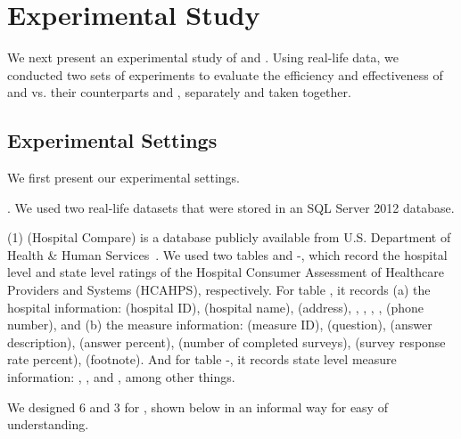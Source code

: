 



\section{Experimental Study}
\label{sec-exp}

We next present an experimental study of \pCFDs and \pCINDs. Using real-life data, we conducted two sets of experiments to evaluate the efficiency and effectiveness of \pCFDs and \pCINDs vs. their counterparts \CFDs and \CINDs, separately and taken together.

\subsection{Experimental Settings}
We first present our experimental settings.

. We used two real-life datasets that were stored in an SQL Server 2012 database.

\ni(1) \hosp (Hospital Compare) is a database publicly available from U.S. Department of Health %
\& Human Services~\cite{hosp}. We used two tables  and -, which record the hospital level and state level ratings of the Hospital Consumer Assessment of Healthcare Providers and Systems (HCAHPS), respectively.
%
For table , it records (a) the hospital information:  (hospital ID),  (hospital name),  (address), , , , ,  (phone number), and (b) the measure information:  (measure ID),  (question),  (answer description),  (answer percent),  (number of completed surveys),  (survey response rate percent),  (footnote).
%
And for table -, it records state level measure information: , ,  and , among other things.


We designed 6 \pCFDs and 3 \pCINDs for \hosp, shown below in an informal way for easy of understanding.

